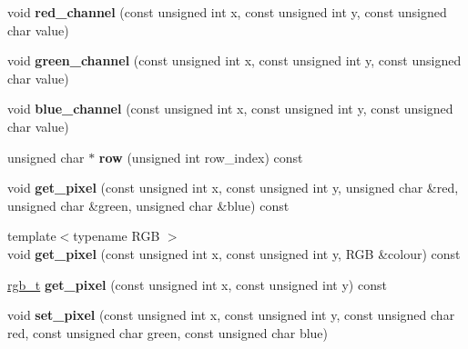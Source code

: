 \begin{DoxyCompactItemize}
\item 
\mbox{\label{classbitmap__image_ae378b56f21032c20a3f074a4dd1feb99}} 
void {\bfseries red\+\_\+channel} (const unsigned int x, const unsigned int y, const unsigned char value)
\item 
\mbox{\label{classbitmap__image_a917420778ba0054443cf81a3465ae14d}} 
void {\bfseries green\+\_\+channel} (const unsigned int x, const unsigned int y, const unsigned char value)
\item 
\mbox{\label{classbitmap__image_a68cd71e3a6e0572df11d21e4f472d681}} 
void {\bfseries blue\+\_\+channel} (const unsigned int x, const unsigned int y, const unsigned char value)
\item 
\mbox{\label{classbitmap__image_ae38b5bf454e794dcdbdb9dc9526f0a60}} 
unsigned char $\ast$ {\bfseries row} (unsigned int row\+\_\+index) const
\item 
\mbox{\label{classbitmap__image_a369f00e83ecf5e14bca0ab98992ed25a}} 
void {\bfseries get\+\_\+pixel} (const unsigned int x, const unsigned int y, unsigned char \&red, unsigned char \&green, unsigned char \&blue) const
\item 
\mbox{\label{classbitmap__image_a6a13c9cfc451fd8ebe024db286005db8}} 
{\footnotesize template$<$typename R\+GB $>$ }\\void {\bfseries get\+\_\+pixel} (const unsigned int x, const unsigned int y, R\+GB \&colour) const
\item 
\mbox{\label{classbitmap__image_a2ae8b2974edcee2d0069f4a59604af0a}} 
\mbox{\hyperlink{structbitmap__image_1_1rgb__t}{rgb\+\_\+t}} {\bfseries get\+\_\+pixel} (const unsigned int x, const unsigned int y) const
\item 
\mbox{\label{classbitmap__image_aa17cf2d9f33c32bd7d9b4f5969c2f48a}} 
void {\bfseries set\+\_\+pixel} (const unsigned int x, const unsigned int y, const unsigned char red, const unsigned char green, const unsigned char blue)
\item 
\mbox{\label{classbitmap__image_a56405ac0c7c07492c45d818a645f2f8a}} 

\end{DoxyCompactItemize}
